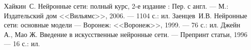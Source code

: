 \renewcommand{\bibname}{\begin{center}Список использованных источников\end{center}}

\begin{thebibliography}{99}
Хайкин~С. Нейронные сети: полный курс, 2-е издание : Пер. с англ. --- 
М.: Издательский дом <<Вильямс>>, 2006. --- 1104 с.: ил.
Заенцев~И.В. Нейронные сети: основные модели --- 
Воронеж: <<Воронеж>>, 1999. --- 76 с.: ил.
Джейн А., Мао Ж. Введение в искусственные нейронные сети. --- 
Препринт статьи, 1996 ---  16 с.: ил.
\end{thebibliography}